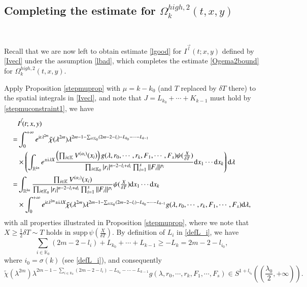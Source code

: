 \documentclass[11pt,reqno]{amsart}
\def\d{{\rm d}}
\numberwithin{equation}{section}
\theoremstyle{definition}
\begin{document}
\subsection{Completing the estimate for $\Omega_k^{high,2}(t,x,y)$}\label{section5.5}\

Recall that we are now left to obtain estimate \eqref{lgood} for $I^{\vec{l}}(t;x,y)$ defined by \eqref{Ivecl} under the assumption \eqref{lbad}, which completes the estimate \eqref{Ogema2bound} for $\Omega_k^{high,2}(t,x,y)$.

Apply Proposition \ref{stepmuprop} with $\mu=k-k_0$ (and $T$ replaced by $\delta T$ there) to the spatial integrals in \eqref{Ivecl}, and note that $J=L_{k_0}+\cdots+K_{k-1}$ must hold by \eqref{stepmuconstraint1}, we have
\begin{equation}\label{related}
	\begin{split}
		&I^{\vec{l}}(t;x,y)\\
		=&\int_0^{+\infty}e^{\mathrm{i}t\lambda^{2m}}\tilde{\chi}(\lambda^{2m})\lambda^{2m-1-\sum_{i\in\mathbb{K}_0}(2m-2-l_i)-L_{k_0}-\cdots-L_{k-1}}\\
		&\times\left(\int_{\mathbb{R}^{kn}}e^{\pm\mathrm{i}\lambda X}\frac{\left(\prod_{i\in\mathbb{K}}V^{(\alpha_i)}(x_i)\right)g(\lambda,r_0,\cdots,r_k,F_1,\cdots,F_s)\psi(\mbox{$\frac{X}{\delta T}$})}{\prod_{i\in\mathbb{K}_0}|r_i|^{n-2-l_i+d_i}\prod_{i=1}^{s}\|F_i\|^{p_i}}\d x_1\cdots \d x_k\right)\d\lambda\\
		=&\int_{\mathbb{R}^{kn}}\frac{\prod_{i\in\mathbb{K}}V^{(\alpha_i)}(x_i)}{\prod_{i\in\mathbb{K}_0}|r_i|^{n-2-l_i+d_i}\prod_{i=1}^{s}\|F_i\|^{p_i}}\psi(\mbox{$\frac{X}{\delta T}$})\d x_1\cdots \d x_k\\
		&\times\int_0^{+\infty}e^{\mathrm{i}t\lambda^{2m}\pm\mathrm{i}\lambda X}\tilde{\chi}(\lambda^{2m})\lambda^{2m-1-\sum_{i\in\mathbb{K}_0}(2m-2-l_i)-L_{k_0}-\cdots-L_{k-1}}g(\lambda,r_0,\cdots,r_k,F_1,\cdots,F_s)\d\lambda,
	\end{split}
\end{equation}
with all properties illustrated in Proposition \ref{stepmuprop}, where we note that $X\geq\frac12\delta T\sim T$ holds in $\mathrm{supp}\,\psi(\frac{X}{\delta T})$. By definition of $L_i$ in \eqref{defL_i}, we have
\begin{equation*}
	\sum_{i\in\mathbb{K}_0}(2m-2-l_i)+L_{k_0}+\cdots+L_{k-1}\geq-L_k=2m-2-l_{i_0},
\end{equation*}
where $i_0=\sigma(k)$ (see \eqref{defL_i}), and consequently
\begin{equation*}
		\tilde{\chi}(\lambda^{2m})\lambda^{2m-1-\sum_{i\in\mathbb{K}_0}(2m-2-l_i)-L_{k_0}-\cdots-L_{k-1}}g(\lambda,r_0,\cdots,r_k,F_1,\cdots,F_s)\in S^{1+l_{i_0}}\left(\mbox{$(\frac{\lambda_0}{2},+\infty)$}\right).
\end{equation*}
\end{document}
